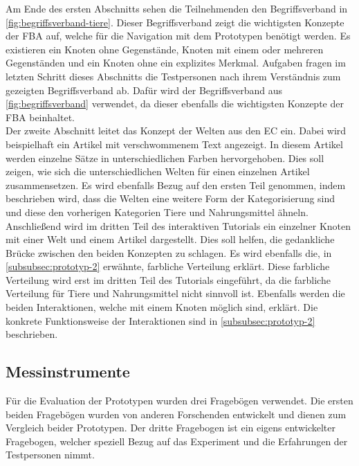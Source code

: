 Am Ende des ersten Abschnitts sehen die Teilnehmenden den Begriffsverband in \autoref{fig:begriffsverband-tiere}.
Dieser Begriffsverband zeigt die wichtigsten Konzepte der \ac{FBA} auf, welche für die Navigation mit dem Prototypen benötigt werden.
Es existieren ein Knoten ohne Gegenstände, Knoten mit einem oder mehreren Gegenständen und ein Knoten ohne ein explizites Merkmal.
Aufgaben fragen im letzten Schritt dieses Abschnitts die Testpersonen nach ihrem Verständnis zum gezeigten Begriffsverband ab.
Dafür wird der Begriffsverband aus \autoref{fig:begriffsverband} verwendet, da dieser ebenfalls die wichtigsten Konzepte der \ac{FBA} beinhaltet.\\

Der zweite Abschnitt leitet das Konzept der Welten aus den \ac{EC} ein.
Dabei wird beispielhaft ein Artikel mit verschwommenem Text angezeigt.
In diesem Artikel werden einzelne Sätze in unterschiedlichen Farben hervorgehoben.
Dies soll zeigen, wie sich die unterschiedlichen Welten für einen einzelnen Artikel zusammensetzen.
Es wird ebenfalls Bezug auf den ersten Teil genommen, indem beschrieben wird, dass die Welten eine weitere Form der Kategorisierung sind und diese den vorherigen Kategorien Tiere und Nahrungsmittel ähneln.\\

Anschließend wird im dritten Teil des interaktiven Tutorials ein einzelner Knoten mit einer Welt und einem Artikel dargestellt.
Dies soll helfen, die gedankliche Brücke zwischen den beiden Konzepten zu schlagen.
Es wird ebenfalls die, in \autoref{subsubsec:prototyp-2} erwähnte, farbliche Verteilung erklärt.
Diese farbliche Verteilung wird erst im dritten Teil des Tutorials eingeführt, da die farbliche Verteilung für Tiere und Nahrungsmittel nicht sinnvoll ist.
Ebenfalls werden die beiden Interaktionen, welche mit einem Knoten möglich sind, erklärt.
Die konkrete Funktionsweise der Interaktionen sind in \autoref{subsubsec:prototyp-2} beschrieben.

\subsection{Messinstrumente}
Für die Evaluation der Prototypen wurden drei Fragebögen verwendet.
Die ersten beiden Fragebögen wurden von anderen Forschenden entwickelt und dienen zum Vergleich beider Prototypen.
Der dritte Fragebogen ist ein eigens entwickelter Fragebogen, welcher speziell Bezug auf das Experiment und die Erfahrungen der Testpersonen nimmt.

